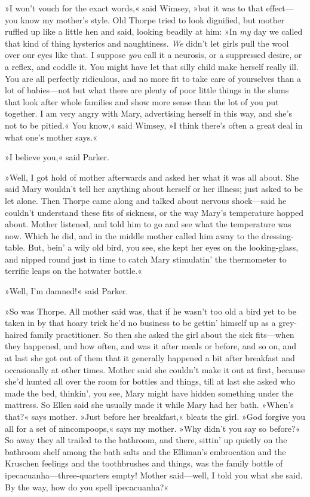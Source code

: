 »I won't vouch for the exact words,« said Wimsey, »but it was to that effect—you know my mother's style. Old Thorpe tried to look dignified, but mother ruffled up like a little hen and said, looking beadily at him: »In \textit{my} day we called that kind of thing hysterics and naughtiness. \textit{We} didn't let girls pull the wool over our eyes like that. I suppose \textit{you} call it a neurosis, or a suppressed desire, or a reflex, and coddle it. You might have let that silly child make herself really ill. You are all perfectly ridiculous, and no more fit to take care of yourselves than a lot of babies—not but what there are plenty of poor little things in the slums that look after whole families and show more sense than the lot of you put together. I am very angry with Mary, advertising herself in this way, and she's not to be pitied.« You know,« said Wimsey, »I think there's often a great deal in what one's mother says.«

»I believe you,« said Parker.

»Well, I got hold of mother afterwards and asked her what it was all about. She said Mary wouldn't tell her anything about herself or her illness; just asked to be let alone. Then Thorpe came along and talked about nervous shock—said he couldn't understand these fits of sickness, or the way Mary's temperature hopped about. Mother listened, and told him to go and see what the temperature was now. Which he did, and in the middle mother called him away to the dressing-table. But, bein' a wily old bird, you see, she kept her eyes on the looking-glass, and nipped round just in time to catch Mary stimulatin' the thermometer to terrific leaps on the hotwater bottle.«

»Well, I'm damned!« said Parker.

»So was Thorpe. All mother said was, that if he wasn't too old a bird yet to be taken in by that hoary trick he'd no business to be gettin' himself up as a grey-haired family practitioner. So then she asked the girl about the sick fits—when they happened, and how often, and was it after meals or before, and so on, and at last she got out of them that it generally happened a bit after breakfast and occasionally at other times. Mother said she couldn't make it out at first, because she'd hunted all over the room for bottles and things, till at last she asked who made the bed, thinkin', you see, Mary might have hidden something under the mattress. So Ellen said she usually made it while Mary had her bath. »When's that?« says mother. »Just before her breakfast,« bleats the girl. »God forgive you all for a set of nincompoops,« says my mother. »Why didn't you say so before?« So away they all trailed to the bathroom, and there, sittin' up quietly on the bathroom shelf among the bath salts and the Elliman's embrocation and the Kruschen feelings and the toothbrushes and things, was the family bottle of ipecacuanha—three-quarters empty! Mother said—well, I told you what she said. By the way, how do you spell ipecacuanha?«


